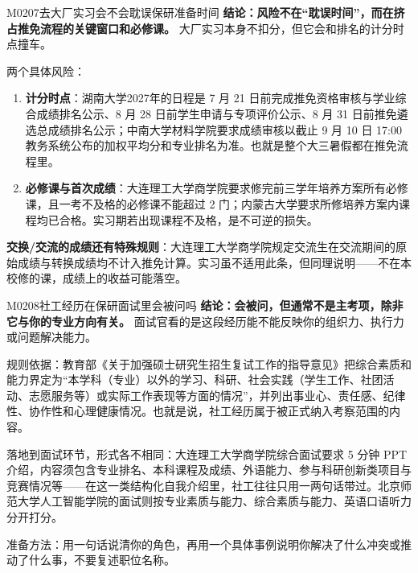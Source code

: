 \begin{qa}{M0207}{去大厂实习会不会耽误保研准备时间}
\textbf{结论：风险不在“耽误时间”，而在挤占推免流程的关键窗口和必修课。} 大厂实习本身不扣分，但它会和排名的计分时点撞车。

两个具体风险：
\begin{enumerate}
  \item \textbf{计分时点}：湖南大学2027年的日程是 7 月 21 日前完成推免资格审核与学业综合成绩排名公示、8 月 28 日前学生申请与专项评价公示、8 月 31 日前推免遴选总成绩排名公示；中南大学材料学院要求成绩审核以截止 9 月 10 日 17:00 教务系统公布的加权平均分和专业排名为准。也就是整个大三暑假都在推免流程里。
  \item \textbf{必修课与首次成绩}：大连理工大学商学院要求修完前三学年培养方案所有必修课，且一考不及格的必修课不能超过 2 门；内蒙古大学要求所修培养方案内课程均已合格。实习期若出现课程不及格，是不可逆的损失。
\end{enumerate}

\textbf{交换/交流的成绩还有特殊规则}：大连理工大学商学院规定交流生在交流期间的原始成绩与转换成绩均不计入推免计算。实习虽不适用此条，但同理说明——不在本校修的课，成绩上的收益可能落空。
\end{qa}

\begin{qa}{M0208}{社工经历在保研面试里会被问吗}
\textbf{结论：会被问，但通常不是主考项，除非它与你的专业方向有关。} 面试官看的是这段经历能不能反映你的组织力、执行力或问题解决能力。

规则依据：教育部《关于加强硕士研究生招生复试工作的指导意见》把综合素质和能力界定为“本学科（专业）以外的学习、科研、社会实践（学生工作、社团活动、志愿服务等）或实际工作表现等方面的情况”，并列出事业心、责任感、纪律性、协作性和心理健康情况。也就是说，社工经历属于被正式纳入考察范围的内容。

落地到面试环节，形式各不相同：大连理工大学商学院综合面试要求 5 分钟 PPT 介绍，内容须包含专业排名、本科课程及成绩、外语能力、参与科研创新类项目与竞赛情况等——在这一类结构化自我介绍里，社工往往只用一两句话带过。北京师范大学人工智能学院的面试则按专业素质与能力、综合素质与能力、英语口语听力分开打分。

准备方法：用一句话说清你的角色，再用一个具体事例说明你解决了什么冲突或推动了什么事，不要复述职位名称。
\end{qa}

